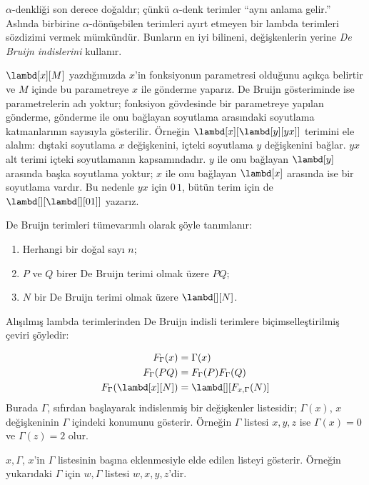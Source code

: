 \documentclass[../../../include/open-logic-section]{subfiles}
\begin{document}


$\alpha$-denkliği son derece doğaldır; çünkü $\alpha$-denk terimler ``aynı
anlama gelir.'' Aslında birbirine $\alpha$-dönüşebilen terimleri ayırt etmeyen
bir lambda terimleri sözdizimi vermek mümkündür. Bunların en iyi bilineni,
değişkenlerin yerine \emph{De Bruijn indislerini} kullanır.

$\lambd[x][M]$ yazdığımızda $x$'in fonksiyonun parametresi olduğunu açıkça
belirtir ve $M$ içinde bu parametreye $x$ ile gönderme yaparız. De Bruijn
gösteriminde ise parametrelerin adı yoktur; fonksiyon gövdesinde bir
parametreye yapılan gönderme, gönderme ile onu bağlayan soyutlama arasındaki
soyutlama katmanlarının sayısıyla gösterilir. Örneğin
$\lambd[x][\lambd[y][y x]]$ terimini ele alalım: dıştaki soyutlama $x$
değişkenini, içteki soyutlama $y$ değişkenini bağlar. $y x$ alt terimi
içteki soyutlamanın kapsamındadır. $y$ ile onu bağlayan $\lambd[y]$ arasında
başka soyutlama yoktur; $x$ ile onu bağlayan $\lambd[x]$ arasında ise bir
soyutlama vardır. Bu nedenle $y x$ için $0\,1$, bütün terim için de
$\lambd[][\lambd[][01]]$ yazarız.

\begin{defn}
  De Bruijn terimleri tümevarımlı olarak şöyle tanımlanır:
  \begin{enumerate}
  \item Herhangi bir doğal sayı $n$;
  \item $P$ ve $Q$ birer De Bruijn terimi olmak üzere $PQ$;
  \item $N$ bir De Bruijn terimi olmak üzere $\lambd[][N]$.
  \end{enumerate}
\end{defn}

Alışılmış lambda terimlerinden De Bruijn indisli terimlere biçimselleştirilmiş
çeviri şöyledir:
\begin{defn}
  \begin{align*}
    F_\Gamma(x) &= \Gamma(x) \\
    F_\Gamma(PQ) &= F_\Gamma(P)F_\Gamma(Q) \\
    F_\Gamma(\lambd[x][N]) &= \lambd[][F_{x,\Gamma}(N)]
  \end{align*}
  Burada $\Gamma$, sıfırdan başlayarak indislenmiş bir değişkenler listesidir;
  $\Gamma(x)$, $x$ değişkeninin $\Gamma$ içindeki konumunu gösterir. Örneğin
  $\Gamma$ listesi $x,y,z$ ise $\Gamma(x)=0$ ve $\Gamma(z)=2$ olur.

  $x,\Gamma$, $x$'in $\Gamma$ listesinin başına eklenmesiyle elde edilen
  listeyi gösterir. Örneğin yukarıdaki $\Gamma$ için $w,\Gamma$ listesi
  $w,x,y,z$'dir.
\end{defn}
\end{document}
